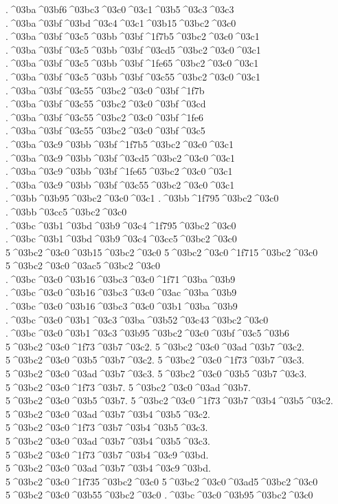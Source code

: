 {.^^^^03ba^^^^03bf6^^^^03bc3^^^^03c0^^^^03c1^^^^03b5^^^^03c3^^^^03c3
.^^^^03ba^^^^03bf^^^^03bd^^^^03c4^^^^03c1^^^^03b15^^^^03bc2^^^^03c0
.^^^^03ba^^^^03bf^^^^03c5^^^^03bb^^^^03bf^^^^1f7b5^^^^03bc2^^^^03c0^^^^03c1  .^^^^03ba^^^^03bf^^^^03c5^^^^03bb^^^^03bf^^^^03cd5^^^^03bc2^^^^03c0^^^^03c1
.^^^^03ba^^^^03bf^^^^03c5^^^^03bb^^^^03bf^^^^1fe65^^^^03bc2^^^^03c0^^^^03c1
.^^^^03ba^^^^03bf^^^^03c5^^^^03bb^^^^03bf^^^^03c55^^^^03bc2^^^^03c0^^^^03c1
.^^^^03ba^^^^03bf^^^^03c55^^^^03bc2^^^^03c0^^^^03bf^^^^1f7b  .^^^^03ba^^^^03bf^^^^03c55^^^^03bc2^^^^03c0^^^^03bf^^^^03cd
.^^^^03ba^^^^03bf^^^^03c55^^^^03bc2^^^^03c0^^^^03bf^^^^1fe6
.^^^^03ba^^^^03bf^^^^03c55^^^^03bc2^^^^03c0^^^^03bf^^^^03c5
.^^^^03ba^^^^03c9^^^^03bb^^^^03bf^^^^1f7b5^^^^03bc2^^^^03c0^^^^03c1  .^^^^03ba^^^^03c9^^^^03bb^^^^03bf^^^^03cd5^^^^03bc2^^^^03c0^^^^03c1
.^^^^03ba^^^^03c9^^^^03bb^^^^03bf^^^^1fe65^^^^03bc2^^^^03c0^^^^03c1
.^^^^03ba^^^^03c9^^^^03bb^^^^03bf^^^^03c55^^^^03bc2^^^^03c0^^^^03c1
.^^^^03bb^^^^03b95^^^^03bc2^^^^03c0^^^^03c1
.^^^^03bb^^^^1f795^^^^03bc2^^^^03c0  .^^^^03bb^^^^03cc5^^^^03bc2^^^^03c0
.^^^^03bc^^^^03b1^^^^03bd^^^^03b9^^^^03c4^^^^1f795^^^^03bc2^^^^03c0  .^^^^03bc^^^^03b1^^^^03bd^^^^03b9^^^^03c4^^^^03cc5^^^^03bc2^^^^03c0
5^^^^03bc2^^^^03c0^^^^03b15^^^^03bc2^^^^03c0
5^^^^03bc2^^^^03c0^^^^1f715^^^^03bc2^^^^03c0  5^^^^03bc2^^^^03c0^^^^03ac5^^^^03bc2^^^^03c0
.^^^^03bc^^^^03c0^^^^03b16^^^^03bc3^^^^03c0^^^^1f71^^^^03ba^^^^03b9  .^^^^03bc^^^^03c0^^^^03b16^^^^03bc3^^^^03c0^^^^03ac^^^^03ba^^^^03b9
.^^^^03bc^^^^03c0^^^^03b16^^^^03bc3^^^^03c0^^^^03b1^^^^03ba^^^^03b9
.^^^^03bc^^^^03c0^^^^03b1^^^^03c3^^^^03ba^^^^03b52^^^^03c43^^^^03bc2^^^^03c0
.^^^^03bc^^^^03c0^^^^03b1^^^^03c3^^^^03b95^^^^03bc2^^^^03c0^^^^03bf^^^^03c5^^^^03b6
5^^^^03bc2^^^^03c0^^^^1f73^^^^03b7^^^^03c2.  5^^^^03bc2^^^^03c0^^^^03ad^^^^03b7^^^^03c2.
5^^^^03bc2^^^^03c0^^^^03b5^^^^03b7^^^^03c2.
5^^^^03bc2^^^^03c0^^^^1f73^^^^03b7^^^^03c3.  5^^^^03bc2^^^^03c0^^^^03ad^^^^03b7^^^^03c3.
5^^^^03bc2^^^^03c0^^^^03b5^^^^03b7^^^^03c3.
5^^^^03bc2^^^^03c0^^^^1f73^^^^03b7.  5^^^^03bc2^^^^03c0^^^^03ad^^^^03b7.
5^^^^03bc2^^^^03c0^^^^03b5^^^^03b7.
5^^^^03bc2^^^^03c0^^^^1f73^^^^03b7^^^^03b4^^^^03b5^^^^03c2.  5^^^^03bc2^^^^03c0^^^^03ad^^^^03b7^^^^03b4^^^^03b5^^^^03c2.
5^^^^03bc2^^^^03c0^^^^1f73^^^^03b7^^^^03b4^^^^03b5^^^^03c3.  5^^^^03bc2^^^^03c0^^^^03ad^^^^03b7^^^^03b4^^^^03b5^^^^03c3.
5^^^^03bc2^^^^03c0^^^^1f73^^^^03b7^^^^03b4^^^^03c9^^^^03bd.  5^^^^03bc2^^^^03c0^^^^03ad^^^^03b7^^^^03b4^^^^03c9^^^^03bd.
5^^^^03bc2^^^^03c0^^^^1f735^^^^03bc2^^^^03c0  5^^^^03bc2^^^^03c0^^^^03ad5^^^^03bc2^^^^03c0
5^^^^03bc2^^^^03c0^^^^03b55^^^^03bc2^^^^03c0
.^^^^03bc^^^^03c0^^^^03b95^^^^03bc2^^^^03c0
}
